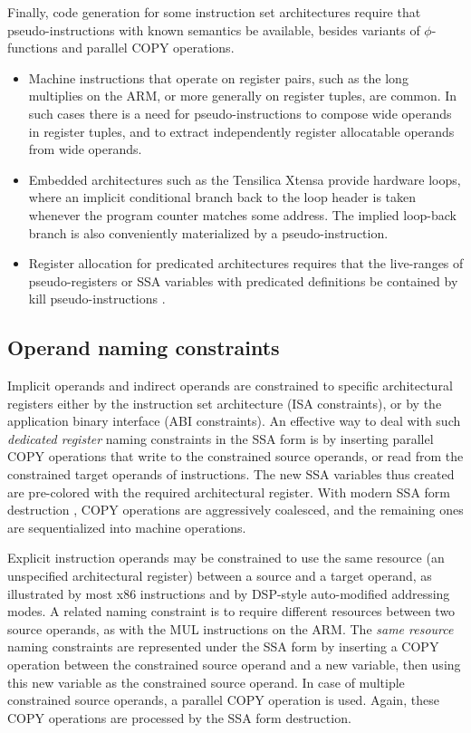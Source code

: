 Finally, code generation for some instruction set architectures require that
pseudo-instructions with known semantics be available, besides variants of
$\phi$-functions and parallel COPY operations. \begin{itemize}

\item Machine instructions that operate on register pairs, such as the long
multiplies on the ARM, or more generally on register tuples, are common. In such
cases there is a need for pseudo-instructions to compose wide operands in
register tuples, and to extract independently register allocatable operands from
wide operands.

\item Embedded architectures such as the Tensilica Xtensa provide hardware
loops, where an implicit conditional branch back to the loop header is taken
whenever the program counter matches some address. The implied loop-back branch
is also conveniently materialized by a pseudo-instruction.

\item Register allocation for predicated architectures requires that the live-ranges
of pseudo-registers or SSA variables with predicated definitions be contained by
kill pseudo-instructions \cite{Gillies:1996:MICRO}.

\end{itemize}

\subsection{Operand naming constraints}

Implicit operands and indirect operands are constrained to specific
architectural registers either by the instruction set architecture (ISA
constraints), or by the application binary interface (ABI constraints). An
effective way to deal with such \emph{dedicated register} naming constraints in
the SSA form is by inserting parallel COPY operations that write to the
constrained source operands, or read from the constrained target operands of
instructions.  The new SSA variables thus created are pre-colored with the
required architectural register. With modern SSA form destruction
\cite{Sreedhar:1999:SAS,Boissinot:2009:CGO}, COPY operations are aggressively
coalesced, and the remaining ones are sequentialized into machine operations.

Explicit instruction operands may be constrained to use the same resource (an
unspecified architectural register) between a source and a target operand, as
illustrated by most x86 instructions and by DSP-style auto-modified addressing
modes.  A related naming constraint is to require different resources between
two source operands, as with the MUL instructions on the ARM. The \emph{same
resource} naming constraints are represented under the SSA form by inserting a
COPY operation between the constrained source operand and a new variable, then
using this new variable as the constrained source operand. In case of multiple
constrained source operands, a parallel COPY operation is used.  Again, these
COPY operations are processed by the SSA form destruction.

